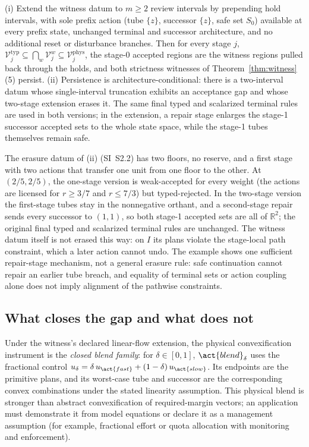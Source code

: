 \begin{proposition}\label{prop:persist}
\textup{(i)} Extend the witness datum to $m\ge2$ review intervals by prepending hold intervals, with sole prefix action  (tube $\{z\}$, successor $\{z\}$, safe set $S_0$) available at every prefix state, unchanged terminal and successor architecture, and no additional reset or disturbance branches. Then for every stage $j$, $\mathcal V^{\mathrm{typ}}_j\subseteq\bigcap_{w}\mathcal V^{w}_j\subseteq\mathcal V^{\mathrm{phys}}_j$, the stage-0 accepted regions are the witness regions pulled back through the holds, and both strictness witnesses of Theorem~\ref{thm:witness}(5) persist.
\textup{(ii)} Persistence is architecture-conditional: there is a two-interval datum whose single-interval truncation exhibits an acceptance gap and whose two-stage extension erases it. The same final typed and scalarized terminal rules are used in both versions; in the extension, a repair stage enlarges the stage-1 successor accepted sets to the whole state space, while the stage-1 tubes themselves remain safe.
\end{proposition}

The erasure datum of (ii) (SI~S2.2) has two floors, no reserve, and a first stage with two actions that transfer one unit from one floor to the other. At $(2/5,2/5)$, the one-stage version is weak-accepted for every weight (the actions are licensed for $r\ge3/7$ and $r\le7/3$) but typed-rejected. In the two-stage version the first-stage tubes stay in the nonnegative orthant, and a second-stage repair sends every successor to $(1,1)$, so both stage-1 accepted sets are all of $\mathbb R^2$; the original final typed and scalarized terminal rules are unchanged. The witness datum itself is not erased this way: on $I$ its plans violate the stage-local path constraint, which a later action cannot undo. The example shows one sufficient repair-stage mechanism, not a general erasure rule: safe continuation cannot repair an earlier tube breach, and equality of terminal sets or action coupling alone does not imply alignment of the pathwise constraints.

\subsection{What closes the gap and what does not}\label{sec:closing}

Under the witness's declared linear-flow extension, the physical convexification instrument is the \emph{closed blend family}: for $\delta\in[0,1]$, $\act{blend}_\delta$ uses the fractional control $u_\delta=\delta\,u_{\act{fast}}+(1-\delta)\,u_{\act{slow}}$. Its endpoints are the primitive plans, and its worst-case tube and successor are the corresponding convex combinations under the stated linearity assumption. This physical blend is stronger than abstract convexification of required-margin vectors; an application must demonstrate it from model equations or declare it as a management assumption (for example, fractional effort or quota allocation with monitoring and enforcement).

